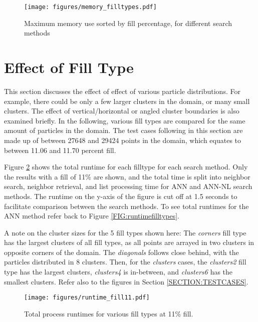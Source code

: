 \begin{figure}[h]
	\centering
	\texttt{[image: figures/memory\_filltypes.pdf]}
	\caption{Maximum memory use sorted by fill percentage, for different search methods} 
	\label{FIG:memoryfilltypes}
\end{figure}

\section{Effect of Fill Type}
\label{SECTION:ANALYSISFILLTYPE}

This section discusses the effect of effect of various particle distributions. For example, there could be only a few larger clusters in the domain, or many small clusters. The effect of vertical/horizontal or angled cluster boundaries is also examined briefly. In the following, various fill types are compared for the same amount of particles in the domain. The test cases following in this section are made up of between 27648 and 29424 points in the domain, which equates to between 11.06 and 11.70 percent fill.

Figure \ref{FIG:runtimefill11} shows the total runtime for each filltype for each search method. Only the results with a fill of 11\% are shown, and the total time is split into neighbor search, neighbor retrieval, and list processing time for ANN and ANN-NL search methods. The runtime on the y-axis of the figure is cut off at 1.5 seconds to facilitate comparison between the search methods. To see total runtimes for the ANN method refer back to Figure \ref{FIG:runtimefilltypes}.

A note on the cluster sizes for the 5 fill types shown here: The {\itshape corners} fill type has the largest clusters of all fill types, as all points are arrayed in two clusters in opposite corners of the domain. The {\itshape diagonals} follows close behind, with the particles distributed in 8 clusters. Then, for the {\itshape clusters} cases, the {\itshape clusters2} fill type has the largest clusters, {\itshape clusters4} is in-between, and {\itshape clusters6} has the smallest clusters. Refer also to the figures in Section \ref{SECTION:TESTCASES}.

\begin{figure}[h]
	\centering
	\texttt{[image: figures/runtime\_fill11.pdf]}
	\caption{Total process runtimes for various fill types at 11\% fill.}
	\label{FIG:runtimefill11}
\end{figure}

